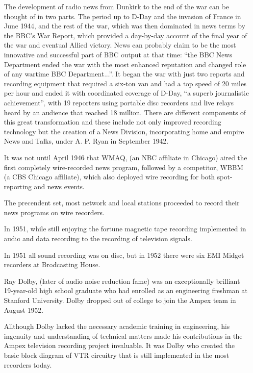 \documentclass[UKenglish]{ifimaster}  %
\begin{document}
The development of radio news from Dunkirk to the end of the war can
be thought of in two parts.  The period up to D-Day and the invasion
of France in June 1944, and the rest of the war, which was then
dominated in news terms by the BBC's War Report, which provided a
day-by-day account of the final year of the war and eventual Allied
victory.  News can probably claim to be the most innovative and
successful part of BBC output at that time: ``the BBC News Department
ended the war with the most enhanced reputation and changed role of
any wartime BBC Department...''.  It began the war with just two
reports and recording equipment that required a six-ton van and had a
top speed of 20 miles per hour and ended it with coordinated coverage
of D-Day, ``a superb journalistic achievement'', with 19 reporters
using portable disc recorders and live relays heard by an audience
that reached 18 million.  There are different components of this great
transformation and these include not only improved recording
technology but the creation of a News Division, incorporating home and
empire News and Talks, under A. P. Ryan in September 1942.

It was not until April 1946 that WMAQ, (an NBC affiliate in Chicago)
aired the first completely wire-recorded news program, followed by a
competitor, WBBM (a CBS Chicago affiliate), which also deployed wire
recording for both spot-reporting and news events.

The precendent set, most network and local stations proceeded to
record their news programs on wire recorders.

In 1951, while still enjoying the fortune magnetic tape recording
implemented in audio and data recording to the recording of television
signals.

In 1951 all sound recording was on disc, but in 1952 there were six
EMI Midget recorders at Brodcasting House.

Ray Dolby, (later of audio noise reduction fame) was an exceptionally
brilliant 19-year-old high school graduate who had enrolled as an
engineering freshman at Stanford University.  Dolby dropped out of
college to join the Ampex team in August 1952.

Allthough Dolby lacked the necessary academic training in engineering,
his ingenuity and understanding of technical matters made his
contributions in the Ampex television recording project invaluable.
It was Dolby who created the basic block diagram of VTR circuitry that
is still implemented in the most recorders today.
\end{document}
